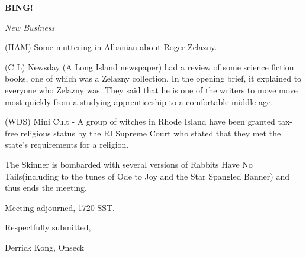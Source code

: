 \documentclass[12pt]{article}
\newcommand{\bing}{{\bf BING!} }
\newcommand{\goto}[1]{\bing \vskip 12pt \centerline{{\em{#1}}}}
\begin{document}
\goto{New Business}

(HAM) Some muttering in Albanian about Roger Zelazny.

(C L) Newsday (A Long Island newspaper) had a review of some science fiction books, one of which was a Zelazny collection.  In the opening brief, it explained to everyone who Zelazny was.  They said that he is one of the writers to move move most quickly from a studying apprenticeship to a comfortable middle-age.

(WDS) Mini Cult - A group of witches in Rhode Island have been granted tax-free religious status by the RI Supreme Court who stated that they met the state's requirements for a religion.

The Skinner is bombarded with several versions of Rabbits Have No Tails(including to the tunes of Ode to Joy and the Star Spangled Banner) and thus ends the meeting.

\vspace{12pt}

\noindent
Meeting adjourned, 1720 SST.

\vspace{18pt}

\centerline{Respectfully submitted,}
\centerline{Derrick Kong, Onseck}
\end{document}
